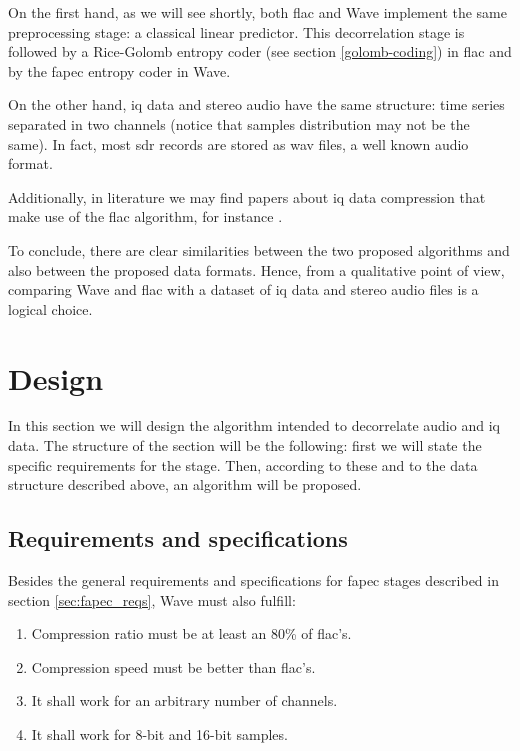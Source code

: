 On the first hand, as we will see shortly, both \acrshort{flac} and Wave implement the same preprocessing stage: a classical linear predictor. This decorrelation stage is followed by a Rice-Golomb entropy coder (see section \ref{golomb-coding}) in \acrshort{flac} and by the \acrshort{fapec} entropy coder in Wave.

On the other hand, \acrshort{iq} data and stereo audio have the same structure: time series separated in two channels (notice that samples distribution may not be the same). In fact, most \acrshort{sdr} records are stored as \acrshort{wav} files, a well known audio format.

Additionally, in literature we may find papers about \acrshort{iq} data compression that make use of the \acrshort{flac} algorithm, for instance \parencite{IQFlac}.

To conclude, there are clear similarities between the two proposed algorithms and also between the proposed data formats. Hence, from a qualitative point of view, comparing Wave and \acrshort{flac} with a dataset of \acrshort{iq} data and stereo audio files is a logical choice.

\section{Design}
In this section we will design the algorithm intended to decorrelate audio and \acrshort{iq} data. The structure of the section will be the following: first we will state the specific requirements for the stage. Then, according to these and to the data structure described above, an algorithm will be proposed.

\subsection{Requirements and specifications}
Besides the general requirements and specifications for \acrshort{fapec} stages described in section \ref{sec:fapec_reqs}, Wave must also fulfill:
\begin{enumerate}
	\item Compression ratio must be at least an 80\% of \acrshort{flac}'s.
	\item Compression speed must be better than \acrshort{flac}'s.
	\item It shall work for an arbitrary number of channels.
	\item It shall work for 8-bit and 16-bit samples.
\end{enumerate}

